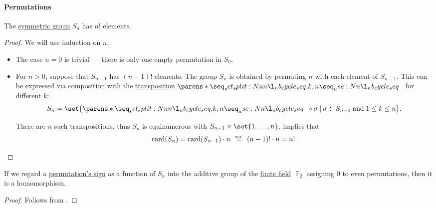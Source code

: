 \paragraph{Permutations}

\begin{proposition}\label{thm:symmetric_group_cardinality}
  The \hyperref[def:symmetric_group]{symmetric group} \( S_n \) has \( n! \) elements.
\end{proposition}
\begin{proof}
  We will use induction on \( n \).

  \begin{itemize}
    \item The case \( n = 0 \) is trivial --- there is only one empty permutation in \( S_0 \).

    \item For \( n > 0 \), suppose that \( S_{n - 1} \) has \( (n - 1)! \) elements. The group \( S_n \) is obtained by permuting \( n \) with each element of \( S_{n - 1} \). This can be expressed via composition with the \hyperref[def:transposition]{transposition} \( \cycle{ k, n } \) for different \( k \):
    \begin{equation*}
      S_n = \set{ \cycle{ k, n } \bincirc \sigma \given \sigma \in S_{n-1} \T{and} 1 \leq k \leq n }.
    \end{equation*}

    There are \( n \) such transpositions, thus \( S_n \) is equinumerous with \( S_{n-1} \times \set{ 1, \ldots, n } \).  implies that
    \begin{equation*}
      \card(S_n)
      =
      \card(S_{n-1}) \cdot n
      \reloset {\T{ind.}} =
      (n - 1)! \cdot n
      =
      n!.
    \end{equation*}
  \end{itemize}
\end{proof}

\begin{lemma}\label{thm:permutation_parity_homomorphism}
  If we regard a \hyperref[def:permutation_parity]{permutation's sign} as a function of \( S_n \) into the additive group of the \hyperref[def:finite_field]{finite field} \( \BbbF_2 \) assigning \( 0 \) to even permutations, then it is a homomorphism.
\end{lemma}
\begin{proof}
  Follows from .
\end{proof}

